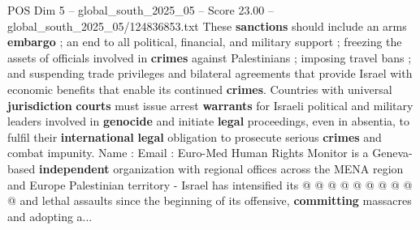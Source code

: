 \begin{textsample}{POS Dim 5 – global\_south\_2025\_05 – Score 23.00 – global\_south\_2025\_05/124836853.txt}
These \textbf{sanctions} should include an arms \textbf{embargo} ; an end to all political, financial, and military support ; freezing the assets of officials involved in \textbf{crimes} against Palestinians ; imposing travel bans ; and suspending trade privileges and bilateral agreements that provide Israel with economic benefits that enable its continued \textbf{crimes}.
Countries with universal \textbf{jurisdiction} \textbf{courts} must issue arrest \textbf{warrants} for Israeli political and military leaders involved in \textbf{genocide} and initiate \textbf{legal} proceedings, even in absentia, to fulfil their \textbf{international} \textbf{legal} obligation to prosecute serious \textbf{crimes} and combat impunity.
Name : Email : Euro-Med Human Rights Monitor is a Geneva-based \textbf{independent} organization with regional offices across the MENA region and Europe Palestinian territory - Israel has intensified its @ @ @ @ @ @ @ @ @ @ and lethal assaults since the beginning of its offensive, \textbf{committing} massacres and adopting a...

\end{textsample}
